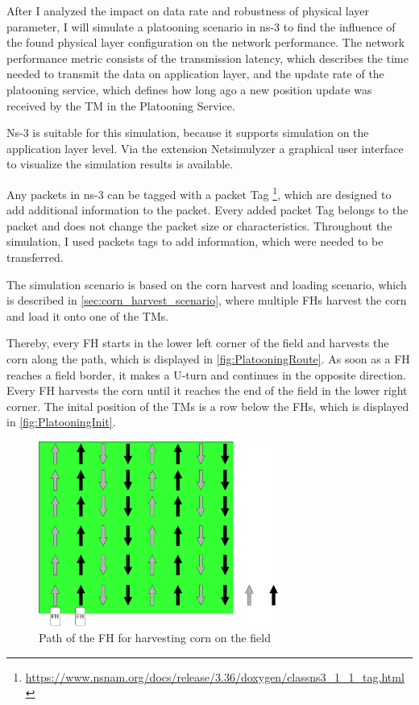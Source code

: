 After I analyzed the impact on data rate and robustness of physical layer parameter, I will simulate a platooning
scenario in ns-3 to find the influence of the found physical layer configuration on the network performance.
The network performance metric consists of the transmission latency, which describes the time needed to transmit the data
on application layer, and the update rate of the platooning service, which defines how long ago a new position update
was received by the \ac{TM} in the Platooning Service.

Ns-3 is suitable for this simulation, because it supports simulation on the application layer level.
Via the extension Netsimulyzer a graphical user interface to visualize the simulation results is available.

Any packets in ns-3 can be tagged with a packet Tag \footnote{\url{https://www.nsnam.org/docs/release/3.36/doxygen/classns3_1_1_tag.html}},
which are designed to add additional information to the packet. Every added packet Tag belongs to the packet and does not change
the packet size or characteristics. Throughout the simulation, I used packets tags to add information, which were needed to be
transferred.

The simulation scenario is based on the corn harvest and loading scenario, which is described in \autoref{sec:corn_harvest_scenario}, where
multiple \ac{FH}s harvest the corn and load it onto one of the \ac{TM}s.

Thereby, every \ac{FH} starts in the lower left corner of the field and harvests the corn along the path,
which is displayed in \autoref{fig:PlatooningRoute}. As soon as a \ac{FH} reaches a field border, it makes a U-turn and continues
in the opposite direction.
Every \ac{FH} harvests the corn until it reaches the end of the field in the lower right corner.
The inital position of the \ac{TM}s is a row below the \ac{FH}s, which is displayed in \autoref{fig:PlatooningInit}.
\begin{figure}[H]%
	\centering
	\includegraphics[width=0.7\textwidth]{figures/drawings-Route}
	\caption{Path of the \acf{FH} for harvesting corn on the field}
	\label{fig:PlatooningRoute}%
\end{figure}

